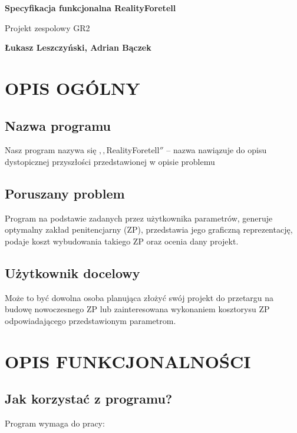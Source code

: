 \documentclass{article}
\begin{document}
\begin{titlepage}
   \begin{center}
       \vspace*{1cm}
       \huge
       \textbf{Specyfikacja funkcjonalna RealityForetell}
       \vspace{0.5cm}
        \par 
        Projekt zespol{}owy GR2
        \par
       \vspace{1.5cm}
       \textbf{\L{}ukasz Leszczy\'nski, Adrian B\k{a}czek}
   \end{center}
\end{titlepage}

\section{OPIS OG\'OLNY}\par
\subsection{Nazwa programu}
Nasz program nazywa si\k{e} $,,$RealityForetell$''$  – nazwa nawiązuje do opisu dystopicznej przyszłości przedstawionej w opisie problemu \par

\subsection{Poruszany problem}
Program na podstawie zadanych przez użytkownika parametrów, generuje optymalny zakład penitencjarny (ZP), przedstawia jego graficzną reprezentację, podaje koszt wybudowania takiego ZP oraz ocenia dany projekt.

\subsection{U\.zytkownik docelowy}
Mo\.ze to by\'c dowolna osoba planuj\k{a}ca złożyć swój projekt do przetargu na budowę nowoczesnego ZP lub zainteresowana wykonaniem kosztorysu ZP odpowiadającego przedstawionym parametrom.

\section{OPIS FUNKCJONALNO\'SCI}
\subsection{Jak korzysta\'c z programu?}
Program wymaga do pracy:\par
\end{document}

